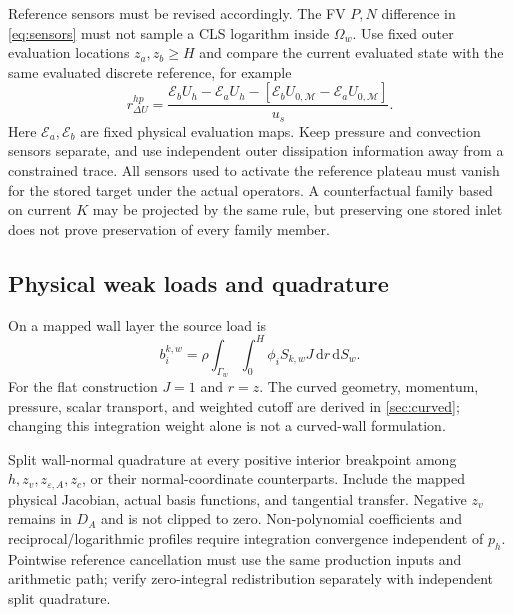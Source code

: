 \documentclass[11pt,a4paper]{article}
\numberwithin{equation}{section}
\newcommand{\dd}{\mathrm{d}}
\newcommand{\eps}{\varepsilon}
\begin{document}
Reference sensors must be revised accordingly. The FV $P,N$ difference
in \cref{eq:sensors} must not sample a CLS logarithm inside $\Omega_w$.
Use fixed outer evaluation locations $z_a,z_b\geq H$ and compare
the current evaluated state with the same evaluated discrete reference,
for example
\begin{equation}
 r_{\Delta U}^{hp}=
 \frac{\mathcal E_b U_h-\mathcal E_a U_h
 -[\mathcal E_b U_{0,\mathcal M}-\mathcal E_a U_{0,\mathcal M}]}{u_s}.
 \label{eq:hp-sensor}
\end{equation}
Here $\mathcal E_a,\mathcal E_b$ are fixed physical evaluation maps.
Keep pressure and convection sensors separate, and use independent
outer dissipation information away from a constrained trace. All
sensors used to activate the reference plateau must vanish for the
stored target under the actual operators. A counterfactual family
based on current $K$ may be projected by the same rule, but preserving
one stored inlet does not prove preservation of every family member.

\subsection{Physical weak loads and quadrature}
On a mapped wall layer the source load is
\begin{equation}
 b_i^{k,w}=\rho\int_{\Gamma_w}\int_0^H
       \phi_i S_{k,w}J\,\dd r\,\dd S_w.
 \label{eq:hp-load}
\end{equation}
For the flat construction $J=1$ and $r=z$. The curved geometry,
momentum, pressure, scalar transport, and weighted cutoff are derived
in \cref{sec:curved}; changing this integration weight alone is not a
curved-wall formulation.

Split wall-normal quadrature at every positive interior breakpoint
among $h,z_v,z_{\eps,A},z_c$, or their normal-coordinate counterparts.
Include the mapped physical Jacobian, actual basis functions, and
tangential transfer. Negative $z_v$ remains in $D_A$ and is not clipped
to zero. Non-polynomial coefficients and reciprocal/logarithmic
profiles require integration convergence independent of $p_h$.
Pointwise reference cancellation must use the same production inputs
and arithmetic path; verify zero-integral redistribution separately
with independent split quadrature.
\end{document}
